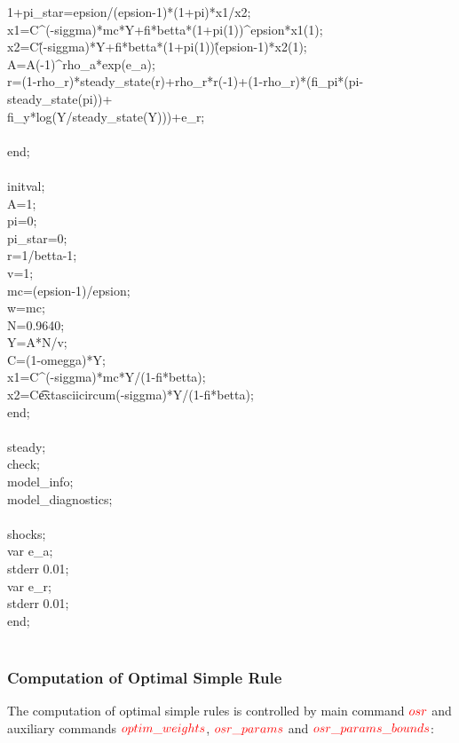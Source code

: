 \documentclass[10pt,math=newtx,citestyle=gb7714-2015,bibstyle=gb7714-2015]{elegantbook}
\begin{document}
{{		1+pi\_star=epsion/(epsion-1)*(1+pi)*x1/x2;\\
		x1=C\textasciicircum(-siggma)*mc*Y+fi*betta*(1+pi(1))\textasciicircum epsion*x1(1);\\
		x2=C\^(-siggma)*Y+fi*betta*(1+pi(1))\^(epsion-1)*x2(1);\\
		A=A(-1)\textasciicircum rho\_a*exp(e\_a);\\
		r=(1-rho\_r)*steady\_state(r)+rho\_r*r(-1)+(1-rho\_r)*(fi\_pi*(pi-steady\_state(pi))+\\
		fi\_y*log(Y/steady\_state(Y)))+e\_r;\\
		\\
		end;\\
		\\
		initval;\\
		A=1;\\
		pi=0;\\
		pi\_star=0;\\
		r=1/betta-1;\\
		v=1;\\
		mc=(epsion-1)/epsion;\\
		w=mc;\\
		N=0.9640;\\
		Y=A*N/v;\\
		C=(1-omegga)*Y;\\
		x1=C\textasciicircum(-siggma)*mc*Y/(1-fi*betta);\\
		x2=C\t extasciicircum(-siggma)*Y/(1-fi*betta);\\
		end;\\
		\\
		steady;\\
		check;\\
		model\_info;\\
		model\_diagnostics;\\
		\\
		shocks;\\
		var e\_a;\\
		stderr 0.01;\\
		var e\_r;\\
		stderr 0.01;\\
		end;}\\
	\\
	
	\subsubsection{Computation of Optimal Simple Rule}
	
	The computation of optimal simple rules is controlled by main command $\textcolor{red}{osr}$ and auxiliary commands $\textcolor{red}{optim\_weights}$, $\textcolor{red}{osr\_params}$ and $\textcolor{red}{osr\_params\_bounds}$:
	
}
\end{document}
